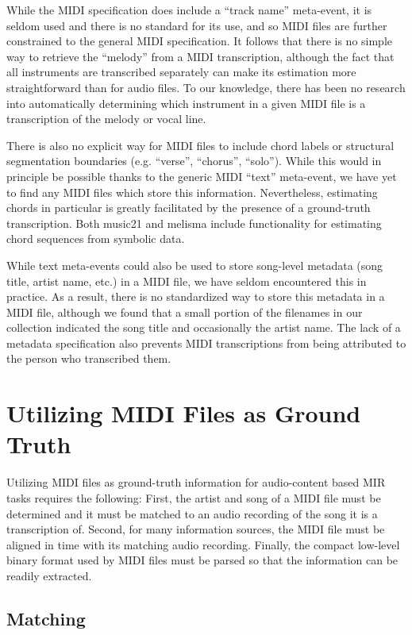 \documentclass{article}
\begin{document}
While the MIDI specification does include a ``track name'' meta-event, it is seldom used and there is no standard for its use, and so MIDI files are further constrained to the general MIDI specification.
It follows that there is no simple way to retrieve the ``melody'' from a MIDI transcription, although the fact that all instruments are transcribed separately can make its estimation more straightforward than for audio files.
To our knowledge, there has been no research into automatically determining which instrument in a given MIDI file is a transcription of the melody or vocal line.

There is also no explicit way for MIDI files to include chord labels or structural segmentation boundaries (e.g. ``verse'', ``chorus'', ``solo'').
While this would in principle be possible thanks to the generic MIDI ``text'' meta-event, we have yet to find any MIDI files which store this information.
Nevertheless, estimating chords in particular is greatly facilitated by the presence of a ground-truth transcription.
Both music21 \cite{cuthbert2010music21} and melisma \cite{sleator2001melisma} include functionality for estimating chord sequences from symbolic data.

While text meta-events could also be used to store song-level metadata (song title, artist name, etc.) in a MIDI file, we have seldom encountered this in practice.
As a result, there is no standardized way to store this metadata in a MIDI file, although we found that a small portion of the filenames in our collection indicated the song title and occasionally the artist name.
The lack of a metadata specification also prevents MIDI transcriptions from being attributed to the person who transcribed them.

\section{Utilizing MIDI Files as Ground Truth}
\label{sec:utilizing}

Utilizing MIDI files as ground-truth information for audio-content based MIR tasks requires the following:
First, the artist and song of a MIDI file must be determined and it must be matched to an audio recording of the song it is a transcription of.
Second, for many information sources, the MIDI file must be aligned in time with its matching audio recording.
Finally, the compact low-level binary format used by MIDI files must be parsed so that the information can be readily extracted.

\subsection{Matching}
\end{document}

